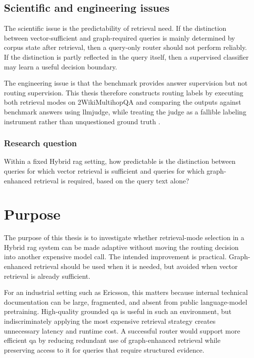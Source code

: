 \documentclass[english, bibtex]{kththesis}               %
\numberwithin{listing}{chapter}
\begin{document}
\subsection{Scientific and engineering issues}
\label{sec:scientificEngineeringIssues}

The scientific issue is the predictability of retrieval need. If the distinction between vector-sufficient and graph-required queries is mainly determined by corpus state after retrieval, then a query-only router should not perform reliably. If the distinction is partly reflected in the query itself, then a supervised classifier may learn a useful decision boundary.

The engineering issue is that the benchmark provides answer supervision but not routing supervision. This thesis therefore constructs routing labels by executing both retrieval modes on 2WikiMultihopQA and comparing the outputs against benchmark answers using \gls{llmjudge}, while treating the judge as a fallible labeling instrument rather than unquestioned ground truth \cite{ho2020twowiki,zheng2023judge}.

\subsubsection{Research question}

Within a fixed Hybrid \gls{rag} setting, how predictable is the distinction between queries for which vector retrieval is sufficient and queries for which graph-enhanced retrieval is required, based on the query text alone?

\section{Purpose}
\label{sec:purpose}
The purpose of this thesis is to investigate whether retrieval-mode selection in a Hybrid \gls{rag} system can be made adaptive without moving the routing decision into another expensive model call. The intended improvement is practical. Graph-enhanced retrieval should be used when it is needed, but avoided when vector retrieval is already sufficient.

For an industrial setting such as Ericsson, this matters because internal technical documentation can be large, fragmented, and absent from public language-model pretraining. High-quality grounded \gls{qa} is useful in such an environment, but indiscriminately applying the most expensive retrieval strategy creates unnecessary latency and runtime cost. A successful router would support more efficient \gls{qa} by reducing redundant use of graph-enhanced retrieval while preserving access to it for queries that require structured evidence.
\end{document}
